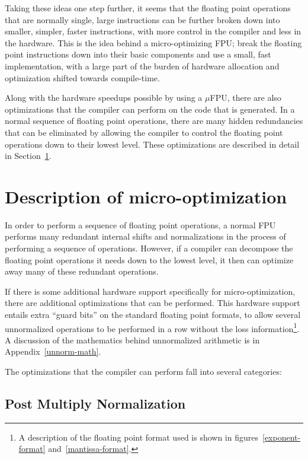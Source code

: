Taking these ideas one step further, it seems that the floating point
operations that are normally single, large instructions can be further broken
down into smaller, simpler, faster instructions, with more control in the
compiler and less in the hardware.  This is the idea behind a
micro-optimizing FPU\@; break the floating point instructions down into their
basic components and use a small, fast implementation, with a large part of
the burden of hardware allocation and optimization shifted towards
compile-time.

Along with the hardware speedups possible by using a $\mu$FPU, there are
also optimizations that the compiler can perform on the code that is
generated.  In a normal sequence of floating point operations, there are
many hidden redundancies that can be eliminated by allowing the compiler to
control the floating point operations down to their lowest level.  These
optimizations are described in detail in Section~\ref{ch1:opts}.

\section{Description of micro-optimization}\label{ch1:opts}

In order to perform a sequence of floating point operations, a normal FPU
performs many redundant internal shifts and normalizations in the process of
performing a sequence of operations.  However, if a compiler can
decompose the floating point operations it needs down to the lowest level,
it then can optimize away many of these redundant operations.  

If there is some additional hardware support specifically for
micro-optimization, there are additional optimizations that can be
performed.  This hardware support entails extra ``guard bits'' on the
standard floating point formats, to allow several unnormalized operations to
be performed in a row without the loss information\footnote{A description of
the floating point format used is shown in figures~\ref{exponent-format}
and~\ref{mantissa-format}.}.  A discussion of the mathematics behind
unnormalized arithmetic is in Appendix~\ref{unnorm-math}.

The optimizations that the compiler can perform fall into several categories:

\subsection{Post Multiply Normalization}

